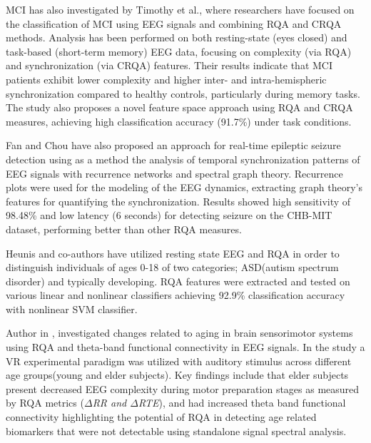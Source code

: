 \documentclass{article}
\begin{document}
			MCI has also investigated by Timothy et al.\cite{timothy2017classification}, where 
			researchers have focused on 
			the classification of MCI using EEG signals and 
			combining RQA and CRQA methods. Analysis has been performed on both resting-state 
			(eyes closed) and task-based (short-term memory) EEG data, 
			focusing on complexity (via RQA) and synchronization (via CRQA) features. 
			Their results indicate that MCI patients exhibit lower complexity
			and higher inter- and intra-hemispheric synchronization compared to healthy controls, 
			particularly during memory tasks. 
			The study also proposes a novel feature space approach using RQA and CRQA measures, 
			achieving high classification accuracy (91.7\%) under task conditions. 
				


			Fan and Chou \cite{fan2019detecting} have also proposed 
			an approach for real-time epileptic seizure detection
			using as a method the analysis of temporal synchronization 
			patterns of EEG signals with recurrence networks and spectral graph theory. 
			Recurrence plots were used for the modeling of the EEG dynamics, 
			extracting graph theory's features for quantifying the synchronization. 
			Results showed high sensitivity of 98.48\% and low latency
			(6 seconds) for detecting seizure on the CHB-MIT dataset, 
			performing better than other RQA measures.  

			Heunis and co-authors\cite{heunis2018} have utilized resting state EEG and RQA in order to
			distinguish individuals of ages 0-18 of two categories; ASD(autism spectrum disorder) and typically developing.
			RQA features were extracted and tested on various linear and nonlinear classifiers achieving 92.9\% classification
			accuracy with nonlinear SVM classifier.

			Author in \cite{pitsik}, investigated changes related to aging in 
			brain sensorimotor systems using 
			RQA and theta-band functional connectivity in EEG signals. 
			In the study a VR experimental paradigm was 
			utilized with auditory stimulus across different age groups(young and elder subjects). 
			Key findings include that elder subjects present 
			decreased EEG complexity during motor preparation stages as 
			measured by RQA metrics (\textit{$\Delta$RR and $\Delta$RTE}), 
			and had increased theta band functional connectivity 
			highlighting the potential of RQA in detecting 
			age related biomarkers that were not detectable using 
			standalone signal spectral analysis.
\end{document}
